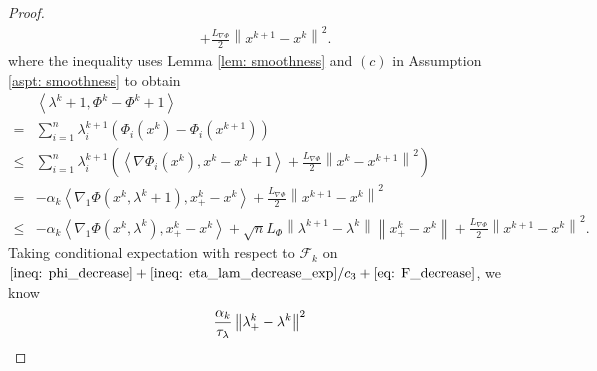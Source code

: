 \documentclass[10pt]{article}
\theoremstyle{remark}
\def\setF{\mathscr{F}} %
\newcommand{\E}{\mathbb{E}}
\newcommand{\norm}[1]{\left\|#1\right\|}
\newcommand{\bfone}{\mathbf{1}}
\def\<#1,#2>{\left\langle #1,#2\right\rangle}
\begin{document}
\begin{proof}
\begin{align}
        & + \frac{L_{\nabla \Phi}}{2}\norm{x^{k+1} - x^k}^2.\label{eq: F_decrease}
\end{align}
where the inequality uses Lemma \ref{lem: smoothness} and $(c)$ in Assumption \ref{aspt: smoothness} to obtain
\begin{align*}
    &\<\lambda^{k+1}, \Phi^k - \Phi^{k+1}> \\
    =&\sum_{i=1}^{n}\lambda_i^{k+1}(\Phi_i(x^k) - \Phi_i(x^{k+1})) \\
        \leq & \sum_{i=1}^{n}\lambda_i^{k+1}\left(\<\nabla \Phi_i(x^k), x^k - x^{k+1}> + \frac{L_{\nabla \Phi}}{2}\norm{x^k - x^{k+1}}^2\right) \\
        = &-\alpha_k\<\nabla_1\Phi(x^k, \lambda^{k+1}), x_+^k - x^k> + \frac{L_{\nabla \Phi}}{2}\norm{x^{k+1} - x^k}^2 \\
        \leq & -\alpha_k\<\nabla_1\Phi(x^k, \lambda^k), x_+^k - x^k> + \sqrt{n}L_{\Phi}\norm{\lambda^{k+1} - \lambda^k}\norm{x_+^k - x^k} + \frac{L_{\nabla \Phi}}{2}\norm{x^{k+1} - x^k}^2.
\end{align*}
Taking conditional expectation with respect to $\setF_k$ on $\eqref{ineq: phi_decrease} + \eqref{ineq: eta_lam_decrease_exp} / c_3 + \eqref{eq: F_decrease}$,  we know
\begin{align}
        &\frac{\alpha_k}{\tau_{\lambda}}\norm{\lambda_+^k - \lambda^k}^2\notag\\

\end{align}
\end{proof}
\end{document}
